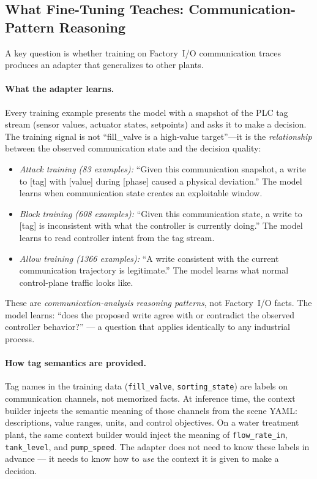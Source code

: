 \documentclass[11pt]{article}
\begin{document}
\subsection*{What Fine-Tuning Teaches: Communication-Pattern Reasoning}

A key question is whether training on Factory~I/O communication traces produces an adapter that generalizes to other plants.

\paragraph{What the adapter learns.}
Every training example presents the model with a snapshot of the PLC tag stream (sensor values, actuator states, setpoints) and asks it to make a decision. The training signal is not ``fill\_valve is a high-value target''---it is the \emph{relationship} between the observed communication state and the decision quality:
\begin{itemize}[leftmargin=1.5em,nosep]
    \item \emph{Attack training (83 examples):} ``Given this communication snapshot, a write to [tag] with [value] during [phase] caused a physical deviation.'' The model learns when communication state creates an exploitable window.
    \item \emph{Block training (608 examples):} ``Given this communication state, a write to [tag] is inconsistent with what the controller is currently doing.'' The model learns to read controller intent from the tag stream.
    \item \emph{Allow training (1366 examples):} ``A write consistent with the current communication trajectory is legitimate.'' The model learns what normal control-plane traffic looks like.
\end{itemize}

These are \emph{communication-analysis reasoning patterns}, not Factory~I/O facts. The model learns: ``does the proposed write agree with or contradict the observed controller behavior?'' --- a question that applies identically to any industrial process.

\paragraph{How tag semantics are provided.}
Tag names in the training data (\texttt{fill\_valve}, \texttt{sorting\_state}) are labels on communication channels, not memorized facts. At inference time, the context builder injects the semantic meaning of those channels from the scene YAML: descriptions, value ranges, units, and control objectives. On a water treatment plant, the same context builder would inject the meaning of \texttt{flow\_rate\_in}, \texttt{tank\_level}, and \texttt{pump\_speed}. The adapter does not need to know these labels in advance --- it needs to know how to \emph{use} the context it is given to make a decision.
\end{document}
